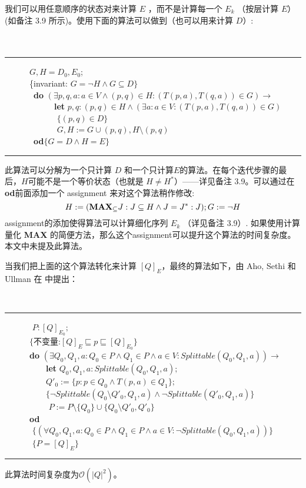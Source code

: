 我们可以用任意顺序的状态对来计算 $E$ ，而不是计算每一个 $E_k$ （按层计算 $E$）(如备注 3.9 所示)。使用下面的算法可以做到（也可以用来计算 $D$）:
\\
\\
\\
\rule{\textwidth}{1pt}
\mbox{　　　}$G,H=D_0,E_0$;\\
\mbox{　　　\{invariant:} $G= \neg H \land G \subseteq D \}$\\
\mbox{　　　 \textbf{do}} $ ( \exists p,q,a : a \in V \land (p,q) \in H : ( T(p,a) , T(q,a) ) \in G  ) \longrightarrow $ \\
\mbox{　　　　　　\textbf{let}} $ p,q :(p,q) \in H \land ( \exists a : a \in V :  ( T(p,a) , T(q,a) ) \in G   ) $ \\
\mbox{　　　　　　} $ \{  (p,q) \in D \}  $ \\
\mbox{　　　　　　} $ G,H:= G \cup {(p,q)},H \setminus {(p,q) } $ \\
\mbox{　　　 \textbf{od}}$ \{ G=D \land H=E \}$ \\
\rule{\textwidth}{1pt}
此算法可以分解为一个只计算 $D$ 和一个只计算$E$的算法。在每个迭代步骤的最后，$H$可能不是一个等价状态（也就是 $ H \not= H^* $）——详见备注 3.9。可以通过在\textbf{od}前面添加一个 assignment 来对这个算法稍作修改:
$$ H := (\mbox{\textbf{MAX}}_{\subseteq } J : J \subseteq H \land J = J ^* : J); G := \neg H $$
assignment的添加使得算法可以计算细化序列 $E_k$ （详见备注 3.9）. 如果使用计算量化 \textbf{MAX} 的简便方法，那么这个assignment可以提升这个算法的时间复杂度。本文中未提及此算法。

当我们把上面的这个算法转化来计算 $[Q]_E$，最终的算法如下，由 Aho, Sethi 和 Ullman 在 \cite[Alg.3.6]{ASU86} 中提出：
\newline

\\
\rule{\textwidth}{1pt}
\mbox{　　　} $P:[Q]_{E_0};$ \\
\mbox{　　　}$\{ \mbox{不变量:} [Q]_E \sqsubseteq p \sqsubseteq [Q]_{E_0} \}$ \\
\mbox{　　　\textbf{do}} $(\exists Q_0,Q_1,a : Q_0 \in P \land Q_1 \in P \land a \in V : Splittable (Q_0,Q_1,a)) \longrightarrow$ \\
\mbox{　　　　　\textbf{let}} $Q_0,Q_1,a:Splittable(Q_0,Q_1,a);$ \\
\mbox{　　　　　}$Q'_0 := \{ p:p\in Q_0 \land T(p,a) \in Q_1 \};$ \\
\mbox{　　　　　}$\{ \neg Splittable (Q_0 \setminus Q'_0 ,Q_1 ,a ) \land \neg Splittable (Q'_0,Q_1,a) \}$ \\
\mbox{　　　　　} $P := P \setminus \{Q_0\} \cup \{Q_0 \setminus Q'_0,Q'_0 \}$ \\
\mbox{　　　\textbf{od}}\\
\mbox{　　　} $ \{ (\forall Q_0,Q_1,a : Q_0 \in P \land Q_1 \in P \land a \in V : \neg Splittable (Q_0,Q_1,a))  \} $ \\
\mbox{　　　} $\{  P = [Q]_E \}$ \\
\rule{\textwidth}{1pt}
此算法时间复杂度为$\mathcal{O}(|Q|^2)$。

